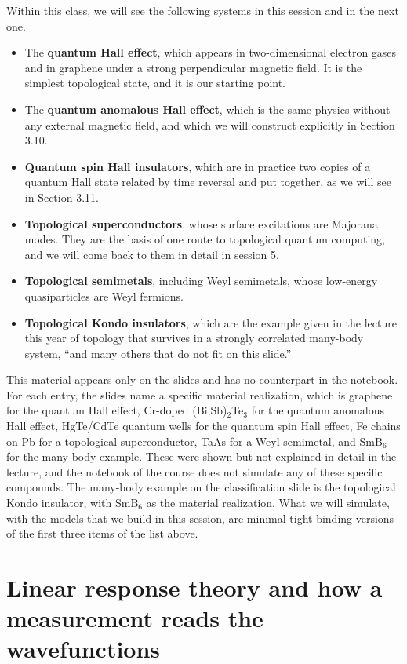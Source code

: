 Within this class, we will see the following systems in this session and in the next one.

\begin{itemize}
\item The \textbf{quantum Hall effect}, which appears in two-dimensional electron gases and in graphene
  under a strong perpendicular magnetic field. It is the simplest topological state, and it is our
  starting point.
\item The \textbf{quantum anomalous Hall effect}, which is the same physics without any external
  magnetic field, and which we will construct explicitly in Section 3.10.
\item \textbf{Quantum spin Hall insulators}, which are in practice two copies of a quantum Hall state
  related by time reversal and put together, as we will see in Section 3.11.
\item \textbf{Topological superconductors}, whose surface excitations are Majorana modes. They are the
  basis of one route to topological quantum computing, and we will come back to them in detail in
  session 5.
\item \textbf{Topological semimetals}, including Weyl semimetals, whose low-energy quasiparticles are
  Weyl fermions.
\item \textbf{Topological Kondo insulators}, which are the example given in the lecture this year of
  topology that survives in a strongly correlated many-body system, ``and many others that do not fit
  on this slide.''
\end{itemize}

This material appears only on the slides and has no counterpart in the notebook. For each entry, the
slides name a specific material realization, which is graphene for the quantum Hall effect, Cr-doped
(Bi,Sb)$_2$Te$_3$ for the quantum anomalous Hall effect, HgTe/CdTe quantum wells for the quantum
spin Hall effect, Fe chains on Pb for a topological superconductor, TaAs for a Weyl semimetal, and SmB$_6$ for
the many-body example. These were shown but not explained in detail in the lecture, and the notebook
of the course does not simulate any of these specific compounds. The many-body example on the
classification slide is the topological Kondo insulator, with SmB$_6$ as the material realization.
What we will simulate, with the models that we build in this session, are minimal tight-binding
versions of the first three items of the list above.

\section{Linear response theory and how a measurement reads the wavefunctions}


